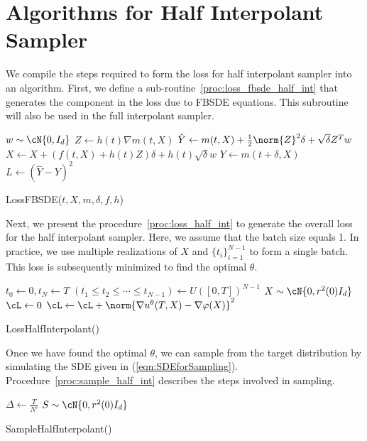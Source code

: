 \onecolumn
{}
\section{Algorithms for Half Interpolant Sampler}\label{apndx:half_interpolant}
We compile the steps required to form the loss for half interpolant sampler into an algorithm. First, we define a sub-routine~\ref{proc:loss_fbsde_half_int} that generates the component in the loss due to FBSDE equations. This subroutine will also be used in the full interpolant sampler. 
\begin{procedure}
\DontPrintSemicolon
    $w\sim\cN{0,I_d}$\;
    $Z \gets h(t)\nabla m(t,X)$\;
    $\hat{Y} \gets m(t,X)+\frac{1}{2}\norm{Z}^2\delta+\sqrt{\delta}{Z}^Tw$\; 
    $X \gets X + \left(f(t,X)+h(t)Z\right)\delta+h(t)\sqrt{\delta}w$\;
    $Y \gets m(t+\delta,X)$\;
    $L \gets \left(\hat{Y}-Y\right)^2$\;
\caption{LossFBSDE($t,X,m,\delta,f,h$)}\label{proc:loss_fbsde_half_int}
\end{procedure} 
Next, we present the procedure~\ref{proc:loss_half_int} to generate the overall loss for the half interpolant sampler. Here, we assume that the batch size equals 1. In practice, we use multiple realizations of $X$ and $\{t_i\}_{i=1}^{N-1}$ to form a single batch. This loss is subsequently minimized to find the optimal $\theta$.
\begin{procedure}
\DontPrintSemicolon
	\KwOut{$\cL$}
$t_0 \gets 0, t_N \gets T$\;
$(t_1\le t_2\le\cdots\le t_{N-1}) \gets U([0,T])^{N-1}$\; %
$X\sim\cN{0,r^2(0)I_d}$\;
$\cL \gets 0$\;
$\cL\gets \cL + \norm{\nabla u^\theta(T,X)-\nabla\varphi(X)}^2$\;
\Return{$\cL$}	\caption{LossHalfInterpolant()}\label{proc:loss_half_int}
\end{procedure}
Once we have found the optimal $\theta$, we can sample from the target distribution by simulating the SDE given in (\ref{eqn:SDEforSampling}). Procedure~\ref{proc:sample_half_int} describes the steps involved in sampling.
\begin{procedure}
\DontPrintSemicolon
$\Delta \gets \frac{T}{N'}$\;
$S\sim\cN{0,r^2(0)I_d}$\;
	\caption{SampleHalfInterpolant()}\label{proc:sample_half_int}
\end{procedure} 


